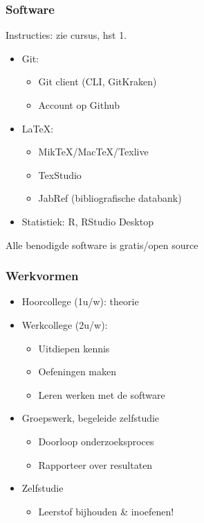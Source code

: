 \documentclass[aspectratio=169]{beamer}
\begin{document}
\begin{frame}
  \frametitle{Software}
  
  Instructies: zie cursus, hst 1.
  
  \begin{itemize}
    \item Git:
    \begin{itemize}
      \item Git client (CLI, GitKraken)
      \item Account op Github
    \end{itemize}
    \item {\LaTeX}:
    \begin{itemize}
      \item MikTeX/MacTeX/Texlive
      \item TexStudio
      \item JabRef (bibliografische databank)
    \end{itemize}
    \item Statistiek: R, RStudio Desktop
  \end{itemize}
  
  \centering
  Alle benodigde software is gratis/open source
\end{frame}

\begin{frame}
  \frametitle{Werkvormen}
  
  \begin{itemize}
    \item Hoorcollege (1u/w): theorie
    \item Werkcollege (2u/w):
    \begin{itemize}
      \item Uitdiepen kennis
      \item Oefeningen maken
      \item Leren werken met de software
    \end{itemize}
    \item Groepswerk, begeleide zelfstudie
    \begin{itemize}
      \item Doorloop onderzoeksproces
      \item Rapporteer over resultaten
    \end{itemize}
    \item Zelfstudie
    \begin{itemize}
      \item Leerstof bijhouden \& inoefenen!
    \end{itemize}
  \end{itemize}
\end{frame}
\end{document}
